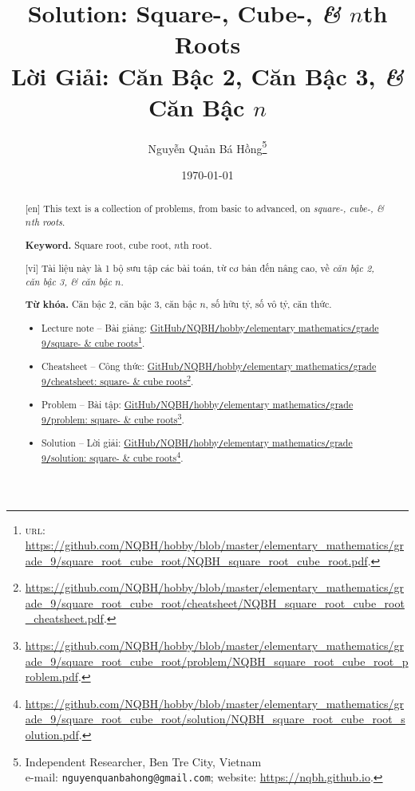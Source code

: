\documentclass{article}
\title{Solution: Square-, Cube-, \textit{\&} $n$th Roots\\Lời Giải: Căn Bậc 2, Căn Bậc 3, \textit{\&} Căn Bậc $n$}
\author{Nguyễn Quản Bá Hồng\footnote{Independent Researcher, Ben Tre City, Vietnam\\e-mail: \texttt{nguyenquanbahong@gmail.com}; website: \url{https://nqbh.github.io}.}}
\date{\today}
\begin{document}
\maketitle
\begin{abstract}
	\textsf{[en]} This text is a collection of problems, from basic to advanced, on \textit{square-, cube-, \& $n$th roots}.
	
	\textsf{\textbf{Keyword.} Square root, cube root, $n$th root.}
	\vspace{2mm}
	
	\textsf{[vi]} Tài liệu này là 1 bộ sưu tập các bài toán, từ cơ bản đến nâng cao, về \textit{căn bậc 2, căn bậc 3, \& căn bậc $n$}.
	
	\textsf{\textbf{Từ khóa.} Căn bậc 2, căn bậc 3, căn bậc $n$, số hữu tỷ, số vô tỷ, căn thức.}
	
	\begin{itemize}
		\item Lecture note -- Bài giảng: \href{https://github.com/NQBH/hobby/blob/master/elementary_mathematics/grade_9/square_root_cube_root/NQBH_square_root_cube_root.pdf}{GitHub\texttt{/}NQBH\texttt{/}hobby\texttt{/}elementary mathematics\texttt{/}grade 9\texttt{/}square- \& cube roots}\footnote{\textsc{url}: \url{https://github.com/NQBH/hobby/blob/master/elementary_mathematics/grade_9/square_root_cube_root/NQBH_square_root_cube_root.pdf}.}.
		\item Cheatsheet -- Công thức: \href{https://github.com/NQBH/hobby/blob/master/elementary_mathematics/grade_9/square_root_cube_root/cheatsheet/NQBH_square_root_cube_root_cheatsheet.pdf}{GitHub\texttt{/}NQBH\texttt{/}hobby\texttt{/}elementary mathematics\texttt{/}grade 9\texttt{/}cheatsheet: square- \& cube roots}\footnote{\url{https://github.com/NQBH/hobby/blob/master/elementary_mathematics/grade_9/square_root_cube_root/cheatsheet/NQBH_square_root_cube_root_cheatsheet.pdf}.}.
		\item Problem -- Bài tập: \href{https://github.com/NQBH/hobby/blob/master/elementary_mathematics/grade_9/square_root_cube_root/problem/NQBH_square_root_cube_root_problem.pdf}{GitHub\texttt{/}NQBH\texttt{/}hobby\texttt{/}elementary mathematics\texttt{/}grade 9\texttt{/}problem: square- \& cube roots}\footnote{\url{https://github.com/NQBH/hobby/blob/master/elementary_mathematics/grade_9/square_root_cube_root/problem/NQBH_square_root_cube_root_problem.pdf}.}.
		\item Solution -- Lời giải: \href{https://github.com/NQBH/hobby/blob/master/elementary_mathematics/grade_9/square_root_cube_root/solution/NQBH_square_root_cube_root_solution.pdf}{GitHub\texttt{/}NQBH\texttt{/}hobby\texttt{/}elementary mathematics\texttt{/}grade 9\texttt{/}solution: square- \& cube roots}\footnote{\url{https://github.com/NQBH/hobby/blob/master/elementary_mathematics/grade_9/square_root_cube_root/solution/NQBH_square_root_cube_root_solution.pdf}.}.
	\end{itemize}
\end{abstract}
\end{document}
